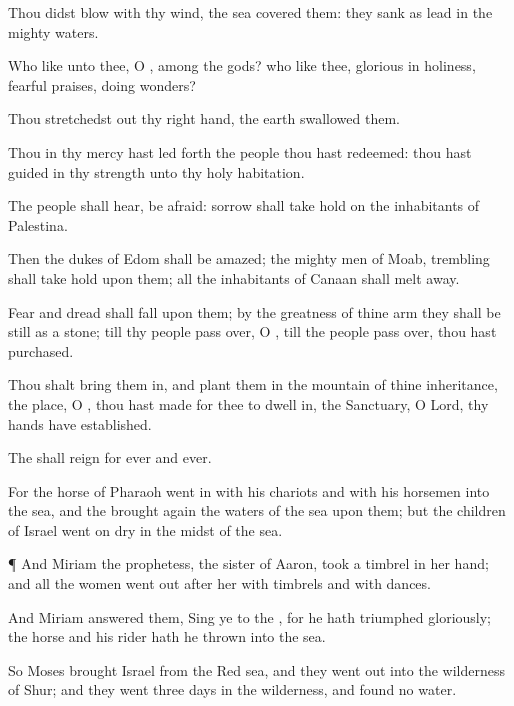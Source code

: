 {Thou didst
blow with thy
wind, the
sea
covered them: they
sank as
lead in the
mighty
waters.

Who
{} like unto thee, O
{}, among the
gods? who
{} like thee,
glorious in
holiness,
fearful
{}
praises,
doing
wonders?

Thou stretchedst
out thy right
hand, the
earth
swallowed them.

Thou in thy
mercy hast led
forth the
people
{} thou hast
redeemed: thou hast
guided
{} in thy
strength unto thy
holy
habitation.

The
people shall
hear,
{} be
afraid:
sorrow shall take
hold on the
inhabitants of
Palestina.

Then the
dukes of
Edom shall be
amazed; the mighty
men of
Moab,
trembling shall take
hold upon them; all the
inhabitants of
Canaan shall melt
away.

Fear and
dread shall
fall upon them; by the
greatness of thine
arm they shall be
{}
still as a
stone; till thy
people pass
over, O
{}, till the
people pass
over,
{} thou hast
purchased.

Thou shalt
bring them in, and
plant them in the
mountain of thine
inheritance,
{} the
place, O
{},
{} thou hast
made for thee to dwell
in,
{} the
Sanctuary, O
Lord,
{} thy
hands have
established.

The
{} shall
reign for
ever and
ever.

For the
horse of
Pharaoh went
in with his
chariots and with his
horsemen into the
sea, and the
{} brought
again the
waters of the
sea upon them; but the
children of
Israel
went on
dry
{} in the
midst of the
sea.


\par }{\PP {}¶ And
Miriam the
prophetess, the
sister of
Aaron,
took a
timbrel in her
hand; and all the
women went
out
after her with
timbrels and with
dances.

And
Miriam
answered them,
Sing ye to the
{}, for he hath
triumphed
gloriously; the
horse and his
rider hath he
thrown into the
sea.


\par }{\PP {}So
Moses
brought
Israel from the
Red
sea, and they went
out into the
wilderness of
Shur; and they
went
three
days in the
wilderness, and
found no
water.


}

